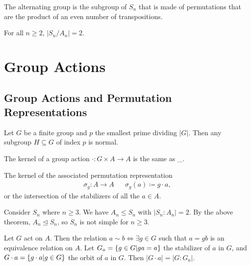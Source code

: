 \documentclass[a5paper]{article}
\begin{document}
\begin{example}
  The alternating group is the subgroup of $S_n$ that is made of permutations
  that are the product of an even number of transpositions.
\end{example}

\begin{theorem}
	For all $n\geq 2$, $|S_n/A_n|=2$.
\end{theorem}

\section{Group Actions}
\subsection{Group Actions and Permutation Representations}
\begin{theorem}
	Let $G$ be a finite group and $p$ the smallest prime dividing $|G|$. Then
  any subgroup $H\subseteq G$ of index $p$ is normal.
\end{theorem}

\begin{note}
  \begin{field}
    The kernel of a group action $\cdot:G\times A\to A$ is the same as \_.
  \end{field}

  \begin{field}
    The kernel of the associated permutation representation
    \begin{align*}
      \sigma_g:A\longrightarrow A && \sigma_g(a)\coloneqq g\cdot a,
    \end{align*}
    or the intersection of the stabilizers of all the $a\in A$.
  \end{field}
\end{note}

\begin{example}
	Consider $S_n$ where $n\geq 3$. We have $A_n\leqslant S_n$ with $|S_n:A_n|=2$.
  By the above theorem, $A_n\trianglelefteq S_n$, so $S_n$ is not simple for
  $n\geq 3$.
\end{example}

\begin{theorem}
	Let $G$ act on $A$. Then the relation $a\sim b\iff \exists g\in G$ such that
  $a=gb$ is an equivalence relation on $A$. Let $G_a=\left\{g\in G|ga=a\right\}$ the
  stabilizer of $a$ in $G$, and $G\cdot a=\left\{g\cdot a|g\in G\right\}$ the orbit of
  $a$ in $G$. Then $|G\cdot a|=|G:G_a|$.
\end{theorem}
\end{document}
